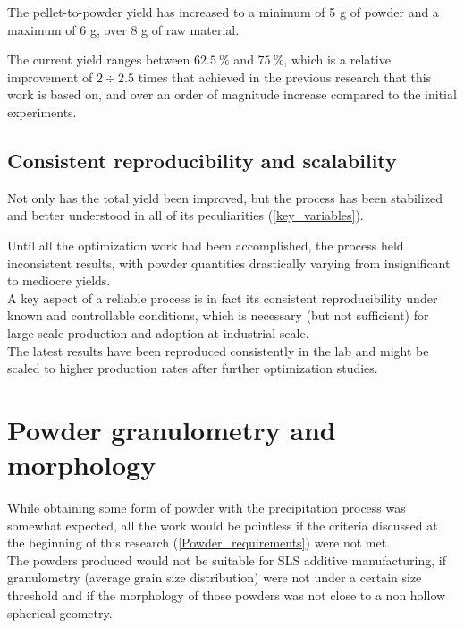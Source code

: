 \documentclass{article}
\begin{document}
        The pellet-to-powder yield has increased to a minimum of 5 g of powder and a maximum of 6 g, over 8 g of raw material. 

        The current yield ranges between $62.5 \ \%$ and $75 \ \%$, which is a relative improvement of $2 \div 2.5$ times that 
        achieved in the previous research that this work is based on, and over an order of magnitude increase compared to the 
        initial experiments. \\ 

        \subsection{Consistent reproducibility and scalability\label{consistent_reproducibility}}

        Not only has the total yield been improved, but the process has been stabilized and better understood in all of its 
        peculiarities (\ref{key_variables}). 

        Until all the optimization work had been accomplished, the process held inconsistent results, with powder quantities drastically 
        varying from insignificant to mediocre yields. \\ 

        A key aspect of a reliable process is in fact its consistent reproducibility under known and controllable conditions, 
        which is necessary (but not sufficient) for large scale production and adoption at industrial scale. \\ 

        The latest results have been reproduced consistently in the lab and might be scaled to higher production rates after 
        further optimization studies. 

    \clearpage
    \section{Powder granulometry and morphology\label{powder_granulometry_morphology}} 

    While obtaining some form of powder with the precipitation process was somewhat expected, all the work would be 
    pointless if the criteria discussed at the beginning of this research (\ref{Powder_requirements}) were not met. \\ 

    The powders produced would not be suitable for SLS additive manufacturing, if granulometry (average grain size distribution)
    were not under a certain size threshold and if the morphology of those powders was not close to a non hollow spherical geometry. \\ 
\end{document}
